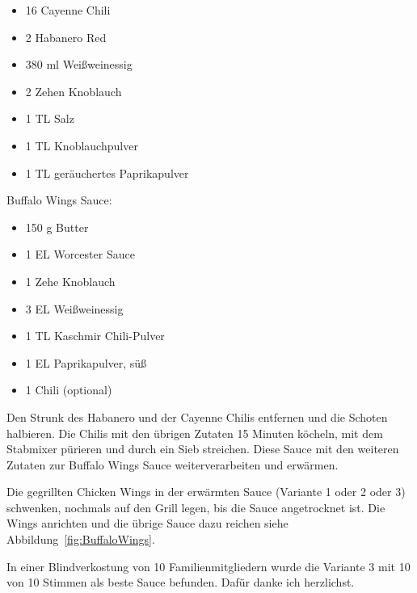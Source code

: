 \begin{itemize}[noitemsep]
	\item 16 Cayenne Chili
	\item 2 Habanero Red
	\item 380 ml Weißweinessig
	\item 2 Zehen Knoblauch
	\item 1 TL Salz
	\item 1 TL Knoblauchpulver
	\item 1 TL geräuchertes Paprikapulver
\end{itemize}

Buffalo Wings Sauce:

\begin{itemize}[noitemsep]
	\item 150 g Butter
	\item 1 EL Worcester Sauce
	\item 1 Zehe Knoblauch 
	\item 3 EL Weißweinessig
	\item 1 TL Kaschmir Chili-Pulver
	\item 1 EL Paprikapulver, süß
	\item 1 Chili (optional)
\end{itemize}

Den Strunk des Habanero und der Cayenne Chilis entfernen und die Schoten 
halbieren. Die Chilis mit den übrigen Zutaten 15 Minuten 
köcheln, mit dem Stabmixer pürieren und durch ein Sieb streichen. Diese Sauce 
mit den weiteren Zutaten zur Buffalo Wings Sauce 
weiterverarbeiten und erwärmen.

Die gegrillten Chicken Wings in der erwärmten Sauce (Variante 1 oder 2 oder 3) 
schwenken, nochmals auf den Grill legen, bis 
die Sauce angetrocknet ist. Die Wings anrichten und die übrige Sauce dazu 
reichen siehe Abbildung~\vref{fig:BuffaloWings}.

In einer Blindverkostung von 10 Familienmitgliedern wurde die Variante 3 mit 10 
von 10 Stimmen als beste Sauce befunden. Dafür danke ich 
herzlichst.                    
\newpage

